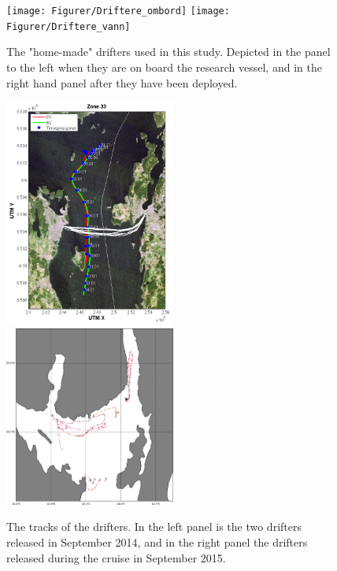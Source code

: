 \begin{figure}[ht]
\centerline{
\texttt{[image: Figurer/Driftere\_ombord]}
\texttt{[image: Figurer/Driftere\_vann]}
}
\caption{\small
The "home-made" drifters used in this study. Depicted in the panel to the left when they are on board the research vessel, and in the right hand panel after they have been deployed.}
\label{fig:drifters_design}
\end{figure}

\begin{figure}[ht]
\centerline{
\includegraphics*[width=0.5\textwidth]{Figurer/drifters_sept2014}
\includegraphics*[width=0.5\textwidth]{Figurer/drifters_low_crop}
}
\caption{\small
The tracks of the drifters. In the left panel is the two drifters released in September 2014, and in the right panel the drifters released during the cruise in September 2015.}
\label{fig:drifters_tracks}
\end{figure}

\newpage
\clearpage
